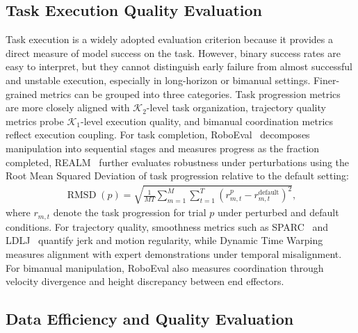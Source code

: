 \documentclass[acmsmall,screen,review]{acmart}
\begin{document}
\subsection{Task Execution Quality Evaluation}\label{sec:eval_task_execution}

Task execution is a widely adopted evaluation criterion because it provides a direct measure of model success on the task.
However, binary success rates are easy to interpret, but they cannot distinguish early failure from almost successful and unstable execution, especially in long-horizon or bimanual settings. 
Finer-grained metrics can be grouped into three categories.
Task progression metrics are more closely aligned with \(\mathcal{K}_2\)-level task organization, trajectory quality metrics probe \(\mathcal{K}_1\)-level execution quality, and bimanual coordination metrics reflect execution coupling.
For task completion, RoboEval~\cite{wang2025roboeval} decomposes manipulation into sequential stages and measures progress as the fraction completed, 
REALM~\cite{sedlacek2025realm} further evaluates robustness under perturbations using the Root Mean Squared Deviation of task progression relative to the default setting:
\begin{align}
  \operatorname{RMSD}(p) = \sqrt{\frac{1}{MT}\sum_{m=1}^{M}\sum_{t=1}^{T}{\left(r_{m,t}^{p}-r_{m,t}^{\text{default}}\right)}^{2}},
  \label{eq:rmsd}
\end{align}
where $r_{m,t}$  denote the task progression for trial $p$ under perturbed and default conditions.
For trajectory quality, smoothness metrics such as SPARC~\cite{balasubramanian2015sparc} and LDLJ~\cite{antonelli2023movement} quantify jerk and motion regularity, while Dynamic Time Warping measures alignment with expert demonstrations under temporal misalignment. 
For bimanual manipulation, RoboEval also measures coordination through velocity divergence and height discrepancy between end effectors.

\subsection{Data Efficiency and Quality Evaluation}\label{sec:eval_data_sample}
\end{document}
